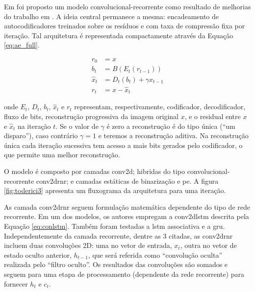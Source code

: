 Em \cite{FullResolution2017Toderici} foi proposto um modelo convolucional-recorrente como resultado de melhorias do trabalho em \cite {Variable2016Toderici}. A ideia central permanece a mesma: encadeamento de autocodificadores treinados sobre os resíduos e com taxa de compressão fixa por iteração.  Tal arquitetura é representada compactamente através da Equação \ref{eq:ae_full}. 

\begin{equation}
\label{eq:ae_full}
\begin{aligned}
r_{0} &=x\\
b_{t} &= B(E_{t}(r_{t-1})) \\
\hat{x}_{t} &= D_{t}(b_{t}) + \gamma \hat{x}_{t-1} \\
r_{t} &= x- \hat{x}_{t}
\end{aligned}
\end{equation}

onde $E_t$, $D_t$, $b_t$, $\hat{x}_t$ e $r_t$ representam, respectivamente, codificador, decodificador, fluxo de bits, reconstrução progressiva da imagem original $x$, e o residual entre $x$ e $\hat{x}_t$ na iteração $t$. Se o valor de $\gamma$ é zero a reconstrução é do tipo única (``um disparo''), caso contrário $\gamma = 1$  e teremos a reconstrução aditiva. Na reconstrução única cada iteração sucessiva tem acesso a mais bits gerados pelo codificador, o que permite uma melhor reconstrução. 


O modelo é composto por camadas \acrshort{conv2d}; hibridas do tipo convolucional-recorrente \acrshort{conv2drnr}; e camadas estáticas de binarização e \gls{pe}. A figura \ref{fig:toderici3} apresenta um fluxograma da arquitetura para uma iteração.


As camada \acrshort{conv2drnr} seguem formulação matemática dependente do tipo de rede recorrente. 
Em um dos modelos, os autores empregam a \acrshort{conv2dlstm} descrita pela Equação \ref{eq:conlstm}. Também foram testadas a \acrshort{lstm} associativa e a \gls{gru}.
Independentemente da camada recorrente, dentre as 3 citadas, as \acrshort{conv2drnr}
incluem duas convoluções 2D: uma no vetor de entrada, $x_t$, outra no vetor de estado oculto anterior, $h_{t-1}$, que será referida como ``convolução oculta'' realizada pelo  ``filtro oculto''. Os resultados das convoluções são somados e seguem para uma etapa de processamento (dependente da rede recorrente) para fornecer $h_t$ e $c_t$.

